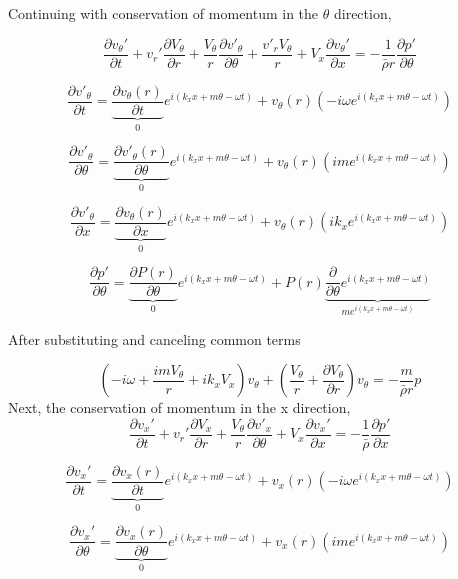 \documentclass[12pt]{article}
\begin{document}
Continuing with conservation of momentum in the $\theta$ direction,

\[\frac{\partial  v_{\theta}' }{\partial t} +
v_r' \frac{\partial  V_{\theta}  }{\partial r} +
\frac{V_{\theta}}{r} \frac{\partial v'_{\theta}}{\partial \theta} +
\frac{v'_rV_{\theta}}{r} +
V_x \frac{\partial v_{\theta}'}{\partial x} 
= -\frac{1}{\bar{\rho} r}	\frac{\partial p'}{\partial \theta}\]

\[\frac{\partial v'_{\theta}}{\partial t} = 
\underbrace{\frac{\partial v_{\theta}(r)}{\partial t}}_{0} e^{i\left(k_x x + m \theta - \omega t \right)} + 
v_{\theta}(r) \left(-i\omega e^{i\left(k_x x + m \theta - \omega t \right)}\right)\]

\[\frac{\partial v'_{\theta}}{\partial \theta} = \underbrace{\frac{\partial v'_{\theta}(r)}{\partial \theta}}_{0} e^{i\left(k_x x + m \theta - \omega t \right)} + v_{\theta}(r) \left(im e^{i\left(k_x x + m \theta - \omega t \right)}\right)\]

\[\frac{\partial v'_{\theta}}{\partial x} = \underbrace{\frac{\partial v_{\theta}(r)}{\partial x}}_{0} e^{i\left(k_x x + m \theta - \omega t \right)} + v_{\theta}(r) \left(ik_x e^{i\left(k_x x + m \theta - \omega t \right)}\right)\]

\[\frac{\partial p'}{\partial \theta} = \underbrace{\frac{\partial P(r)}{\partial \theta}}_{0} e^{i\left(k_x x + m \theta - \omega t \right)} + P(r)\underbrace{\frac{\partial}{\partial  \theta} e^{i\left(k_x x + m \theta - \omega t \right)}}_{m  e^{i\left(k_x x + m \theta - \omega t \right)}}\]



After substituting and canceling common terms 

\[\left(-i\omega + \frac{i m V_{\theta}}{r} + i k_x V_x \right) v_{\theta} + \left(\frac{V_{\theta}}{r} +  \frac{\partial V_{\theta}}{\partial r}\right)v_\theta= -\frac{m}{\bar{\rho}r}p\]
Next, the conservation of momentum in the x direction,
\[\frac{\partial  v_x' }{\partial t} +
v_r' \frac{\partial  V_x  }{\partial r} +
\frac{V_{\theta}}{r} \frac{\partial v'_x}{\partial \theta} +
V_x \frac{\partial v_x'}{\partial x} 
= -\frac{1    }{\bar{\rho}}  \frac{\partial p'}{\partial x} \]


\[\frac{\partial v_x'}{\partial t} = \underbrace{\frac{\partial v_x(r)}{\partial t}}_{0} e^{i\left(k_x x + m \theta - \omega t \right)} + 
v_x(r) \left(-i\omega e^{i\left(k_x x + m \theta - \omega t \right)}\right)\]

\[\frac{\partial v_x'}{\partial \theta} = \underbrace{\frac{\partial v_x(r)}{\partial \theta}}_{0} e^{i\left(k_x x + m \theta - \omega t \right)} + 
v_x(r) \left(im e^{i\left(k_x x + m \theta - \omega t \right)}\right)\]
\end{document}
